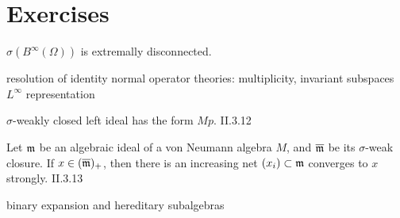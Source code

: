 \documentclass{../../large}
\begin{document}
\section*{Exercises}
\begin{prb}
$\sigma(B^\infty(\Omega))$ is extremally disconnected.
\end{prb}

resolution of identity
normal operator theories: multiplicity, invariant subspaces
$L^\infty$ representation


$\sigma$-weakly closed left ideal has the form $Mp$. II.3.12

Let $\mathfrak{m}$ be an algebraic ideal of a von Neumann algebra $M$, and $\overline{\mathfrak{m}}$ be its $\sigma$-weak closure.
If $x\in(\overline{\mathfrak{m}})_+$, then there is an increasing net $(x_i)\subset\mathfrak{m}$ converges to $x$ strongly. II.3.13



binary expansion and hereditary subalgebras
\end{document}
